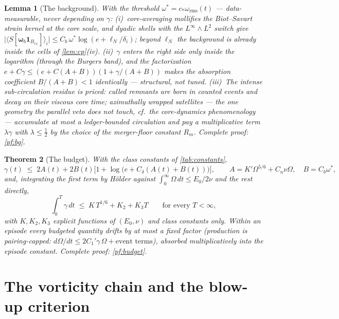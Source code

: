 \documentclass[11pt,letterpaper]{amsart}
\newtheorem{theorem}{Theorem}[section]
\newtheorem{lemma}[theorem]{Lemma}
\theoremstyle{definition}
\theoremstyle{remark}
\newcommand{\om}{\omega}
\newcommand{\vort}{\boldsymbol{\omega}}
\newcommand{\abs}[1]{\lvert #1 \rvert}
\begin{document}
\begin{lemma}[The background]\label{lem:bg}
With the threshold $\om^*=c_*\om_{\mathrm{rms}}(t)$ --- data-measurable, never
depending on $\gamma$: \textup{(i)}~core-averaging mollifies the Biot--Savart strain
kernel at the core scale, and dyadic shells with the $L^\infty\wedge L^2$ switch give
$\abs{\langle S[\vort_b\mathbf{1}_{B_{\ell_N}}]\rangle_i}\le
C_b\,\om^*\log(e+\ell_N/\delta_i)$; beyond $\ell_N$ the background is already inside
the cells of \cref{lem:cp}(iv). \textup{(ii)}~$\gamma$ enters the right side only
inside the logarithm (through the Burgers band), and the factorization
$e+C\gamma\le(e+C(A+B))(1+\gamma/(A+B))$ makes the absorption coefficient $B/(A+B)<1$
\emph{identically} --- structural, not tuned. \textup{(iii)}~The intense
sub-circulation residue is priced: culled remnants are born in counted events and
decay on their viscous core time; azimuthally wrapped satellites --- the one geometry
the parallel veto does not touch, cf.\ the core-dynamics phenomenology
\cite{MelanderHussain1994} --- accumulate at most a ledger-bounded circulation and pay
a multiplicative term $\lambda\gamma$ with $\lambda\le\tfrac12$ by the choice of the
merger-floor constant $R_m$. Complete proof: \cref{pf:bg}.
\end{lemma}

\begin{theorem}[The budget]\label{thm:budget}
With the class constants of \cref{tab:constants},
\[
\gamma(t)\;\le\;2A(t)+2B(t)\bigl[1+\log\bigl(e+C_\delta(A(t)+B(t))\bigr)\bigr],
\qquad A=K'\Omega^{5/6}+C_n\nu\Omega,\quad B=C_b\om^*,
\]
and, integrating the first term by H\"older against
$\int_0^\infty\Omega\,dt\le E_0/2\nu$ and the rest directly,
\[
\int_0^T\gamma\,dt\;\le\;K\,T^{1/6}+K_2+K_3T
\qquad\text{for every }T<\infty,
\]
with $K,K_2,K_3$ explicit functions of $(E_0,\nu)$ and class constants only. Within an
episode every budgeted quantity drifts by at most a fixed factor (production is
pairing-capped: $d\Omega/dt\le2C_1'\gamma\,\Omega+\text{event terms}$), absorbed
multiplicatively into the episode constant. Complete proof: \cref{pf:budget}.
\end{theorem}

\section{The vorticity chain and the blow-up criterion}\label{sec:chain}
\end{document}
